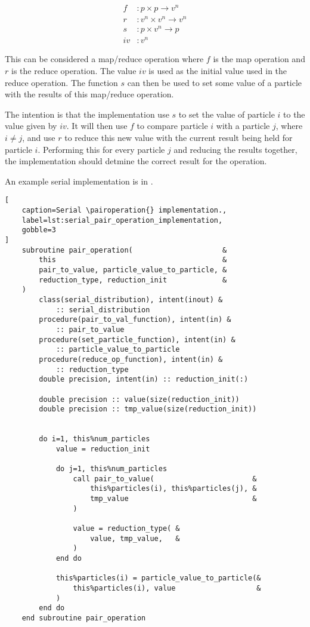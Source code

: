 \begin{equation}
    \begin{split}
        f &: p\times{}p \rightarrow{} v^n \\
        r &: v^n\times{}v^n \rightarrow{} v^n \\
        s &: p\times{}v^n \rightarrow{} p \\
        iv &: v^n
    \end{split}
\end{equation}

This can be considered a map/reduce operation where $f$ is the map operation
and $r$ is the reduce operation.
%
The value $iv$ is used as the initial value used in the reduce operation.
%
The function $s$ can then be used to set some value of a particle with
the results of this map/reduce operation.

The intention is that the implementation use $s$ to set the value
of particle $i$ to the value given by $iv$.
%
It will then use $f$ to compare particle
$i$ with a particle $j$, where $i \ne{} j$, and use $r$ to
reduce this new value with the current result being held for
particle $i$.
%
Performing this for every particle $j$ and reducing the results together,
the implementation should detmine the correct result for the operation.

An example serial implementation is in
.

\begin{lstlisting}[
    caption=Serial \pairoperation{} implementation.,
    label=lst:serial_pair_operation_implementation,
    gobble=3
]
    subroutine pair_operation(                     &
        this                                       &
        pair_to_value, particle_value_to_particle, &
        reduction_type, reduction_init             &
    )
        class(serial_distribution), intent(inout) &
            :: serial_distribution
        procedure(pair_to_val_function), intent(in) &
            :: pair_to_value
        procedure(set_particle_function), intent(in) &
            :: particle_value_to_particle
        procedure(reduce_op_function), intent(in) &
            :: reduction_type
        double precision, intent(in) :: reduction_init(:)

        double precision :: value(size(reduction_init))
        double precision :: tmp_value(size(reduction_init))


        do i=1, this%num_particles
            value = reduction_init

            do j=1, this%num_particles
                call pair_to_value(                       &
                    this%particles(i), this%particles(j), &
                    tmp_value                             &
                )

                value = reduction_type( &
                    value, tmp_value,   &
                )
            end do

            this%particles(i) = particle_value_to_particle(&
                this%particles(i), value                   &
            )
        end do
    end subroutine pair_operation
\end{lstlisting}

